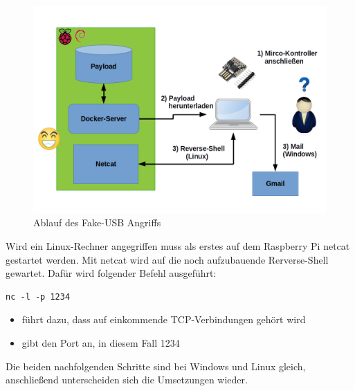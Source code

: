 \begin{figure}[H]
	\centering
	\includegraphics[width=\textwidth]{images/fakeusb/Keylogger_Ueberblick}
	\caption{Ablauf des Fake-USB Angriffs}
	\label{fig:fake_usb_ablauf}
\end{figure}

Wird ein Linux-Rechner angegriffen muss als erstes auf dem Raspberry Pi netcat gestartet werden. Mit netcat wird auf die noch aufzubauende Rerverse-Shell gewartet. Dafür wird folgender Befehl ausgeführt:

\begin{lstlisting}
nc -l -p 1234
\end{lstlisting}

\begin{itemize}
\item {} führt dazu, dass auf einkommende TCP-Verbindungen gehört wird
\item {} gibt den Port an, in diesem Fall 1234
\end{itemize}

Die beiden nachfolgenden Schritte sind bei Windows und Linux gleich, anschließend unterscheiden sich die Umsetzungen wieder.

